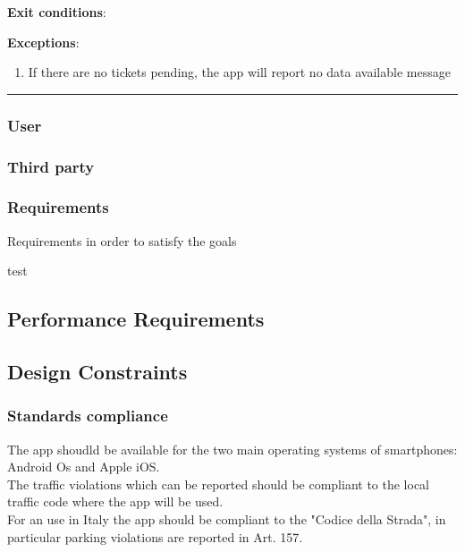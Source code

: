 \begin{enumerate}
\begin{itemize}
\begin{enumerate}
    \end{enumerate}
    \textbf{Exit conditions}:
    \begin{enumerate}

    \end{enumerate}
    \textbf{Exceptions}:
    \begin{enumerate}
      \item{If there are no tickets pending, the app will report no data available message}
    \end{enumerate}
    \rule{\linewidth}{0.4pt}



\subsubsection{User}
\subsubsection{Third party}

\subsubsection{Requirements}
Requirements in order to satisfy the goals
\begin{enumerate}
   test
\end{enumerate}



\subsection{Performance Requirements}

\subsection{Design Constraints}%

\subsubsection{Standards compliance}
The app shoudld be available for the two main operating systems of smartphones: Android Os and Apple iOS.\\
The traffic violations which can be reported should be compliant to the local traffic code where the app will be used.\\
For an use in Italy the app should be compliant to the "Codice della Strada", in particular parking violations are reported in Art. 157.\\



\end{itemize}
\end{enumerate}
